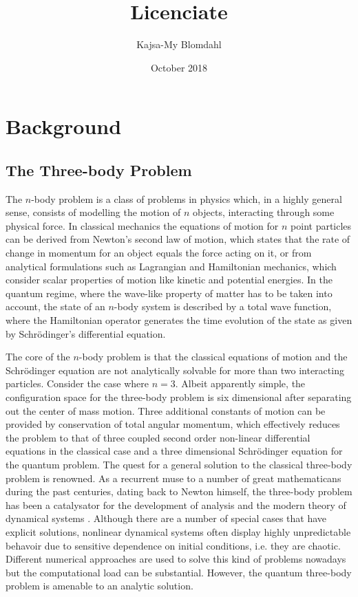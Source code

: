 \documentclass{article}
\title{Licenciate}
\author{Kajsa-My Blomdahl}
\date{October 2018}
\begin{document}
\maketitle

\tableofcontents

\section{Background}
\subsection{The Three-body Problem}
The $n$-body problem is a class of problems in physics which, in a highly general sense, consists of modelling the motion of $n$ objects, interacting through some physical force. In classical mechanics the equations of motion for $n$ point particles can be derived from Newton's second law of motion, which states that the rate of change in momentum for an object equals the force acting on it, or from analytical formulations such as Lagrangian and Hamiltonian mechanics, which consider scalar properties of motion like kinetic and potential energies. In the quantum regime, where the wave-like property of matter has to be taken into account, the state of an $n$-body system is described by a total wave function, where the Hamiltonian operator generates the time evolution of the state as given by Schr{\"o}dinger's differential equation.

The core of the $n$-body problem is that the classical equations of motion and the Schr{\"o}dinger equation are not analytically solvable for more than two interacting particles. Consider the case where $n=3$. Albeit apparently simple, the configuration space for the three-body problem is six dimensional after separating out the center of mass motion. Three additional constants of motion can be provided by conservation of total angular momentum, which effectively reduces the problem to that of three coupled second order non-linear differential equations in the classical case and a three dimensional Schr{\"o}dinger equation for the quantum problem. The quest for a general solution to the classical three-body problem is renowned. As a recurrent muse to a number of great mathematicans during the past centuries, dating back to Newton himself, the three-body problem has been a catalysator for the development of analysis and the modern theory of dynamical systems \cite{Chenciner2015}. Although there are a number of special cases that have explicit solutions, nonlinear dynamical systems often display highly unpredictable behavoir due to sensitive dependence on initial conditions, i.e. they are chaotic. Different numerical approaches are used to solve this kind of problems nowadays but the computational load can be substantial. However, the quantum three-body problem is amenable to an analytic solution. 
\end{document}
